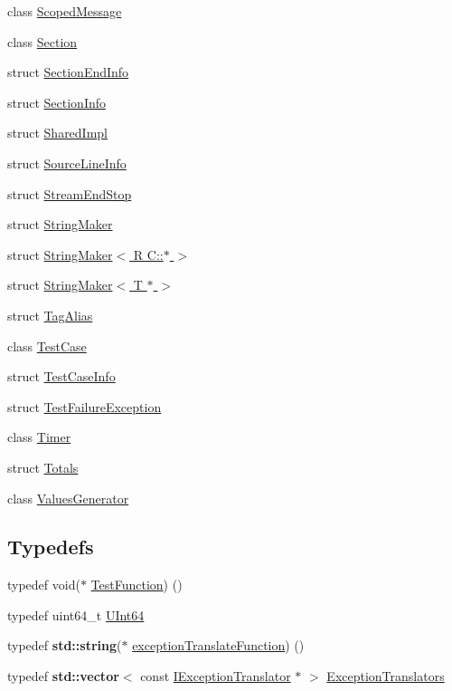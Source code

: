 \begin{DoxyCompactItemize}
\item 
class \hyperlink{class_catch_1_1_scoped_message}{Scoped\+Message}
\item 
class \hyperlink{class_catch_1_1_section}{Section}
\item 
struct \hyperlink{struct_catch_1_1_section_end_info}{Section\+End\+Info}
\item 
struct \hyperlink{struct_catch_1_1_section_info}{Section\+Info}
\item 
struct \hyperlink{struct_catch_1_1_shared_impl}{Shared\+Impl}
\item 
struct \hyperlink{struct_catch_1_1_source_line_info}{Source\+Line\+Info}
\item 
struct \hyperlink{struct_catch_1_1_stream_end_stop}{Stream\+End\+Stop}
\item 
struct \hyperlink{struct_catch_1_1_string_maker}{String\+Maker}
\item 
struct \hyperlink{struct_catch_1_1_string_maker_3_01_r_01_c_1_1_5_01_4}{String\+Maker$<$ R C\+::$\ast$ $>$}
\item 
struct \hyperlink{struct_catch_1_1_string_maker_3_01_t_01_5_01_4}{String\+Maker$<$ T $\ast$ $>$}
\item 
struct \hyperlink{struct_catch_1_1_tag_alias}{Tag\+Alias}
\item 
class \hyperlink{class_catch_1_1_test_case}{Test\+Case}
\item 
struct \hyperlink{struct_catch_1_1_test_case_info}{Test\+Case\+Info}
\item 
struct \hyperlink{struct_catch_1_1_test_failure_exception}{Test\+Failure\+Exception}
\item 
class \hyperlink{class_catch_1_1_timer}{Timer}
\item 
struct \hyperlink{struct_catch_1_1_totals}{Totals}
\item 
class \hyperlink{class_catch_1_1_values_generator}{Values\+Generator}
\end{DoxyCompactItemize}
\subsection*{Typedefs}
\begin{DoxyCompactItemize}
\item 
typedef void($\ast$ \hyperlink{namespace_catch_a26414f52d0835939fae52aadd27e6257}{Test\+Function}) ()
\item 
typedef uint64\+\_\+t \hyperlink{namespace_catch_a47aaf167582b2a30e5acd3bd874deb05}{U\+Int64}
\item 
typedef \textbf{ std\+::string}($\ast$ \hyperlink{namespace_catch_a14edb319150d3e108bbdef994f9eec2a}{exception\+Translate\+Function}) ()
\item 
typedef \textbf{ std\+::vector}$<$ const \hyperlink{struct_catch_1_1_i_exception_translator}{I\+Exception\+Translator} $\ast$ $>$ \hyperlink{namespace_catch_ae0442a3627f91437716106138b5f540b}{Exception\+Translators}
\end{DoxyCompactItemize}
